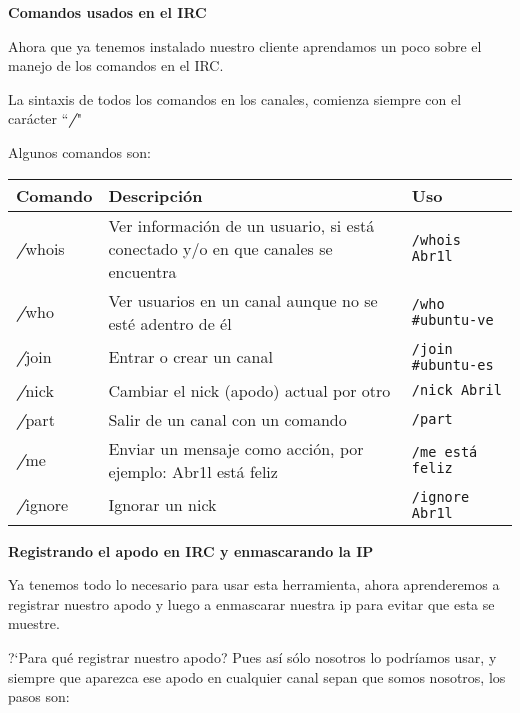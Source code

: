 \documentclass[12pt,letterpaper]{article}
\begin{document}
\begin{center} %
{\bf \large Comandos usados en el IRC} %
\end{center}

Ahora que ya tenemos instalado nuestro cliente aprendamos un poco sobre el manejo de los comandos en el IRC.

La sintaxis de todos los comandos en los canales, comienza siempre con el carácter ``{\bfseries\itshape /}"

Algunos comandos son:

\begin{tabularx}{15cm}{||l|X|l||}
\hline\hline
\textbf{Comando} & \textbf{Descripci\'on}  & \textbf{Uso} \\
\hline \hline
{\bfseries\itshape /}whois & Ver informaci\'on de un usuario, si está conectado y/o en que canales se encuentra & \texttt{/whois Abr1l} \\
\hline
{\bfseries\itshape /}who & Ver usuarios en un canal aunque no se esté adentro de él & \texttt{/who \#ubuntu-ve} \\
\hline 
{\bfseries\itshape /}join & Entrar o crear un canal & \texttt{/join \#ubuntu-es} \\
\hline
{\bfseries\itshape /}nick & Cambiar el nick (apodo) actual por otro & \texttt{/nick Abril} \\
\hline
{\bfseries\itshape /}part & Salir de un canal con un comando & \texttt{/part} \\
\hline 
{\bfseries\itshape /}me & Enviar un mensaje como acci\'on, por ejemplo: Abr1l est\'a feliz & \texttt{/me est\'a feliz} \\
\hline
{\bfseries\itshape /}ignore & Ignorar un nick & \texttt{/ignore Abr1l} \\
\hline\hline
\end{tabularx} 

\begin{center} %
{\bf \large Registrando el apodo en IRC y enmascarando la IP} %
\end{center}

Ya tenemos todo lo necesario para usar esta herramienta, ahora aprenderemos a registrar nuestro apodo y luego a enmascarar nuestra ip para evitar que esta se muestre.

?`Para qu\'e registrar nuestro apodo? Pues as\'i s\'olo nosotros lo podr\'iamos usar, y siempre que aparezca ese apodo en cualquier canal sepan que somos nosotros, los pasos son: 
\end{document}
